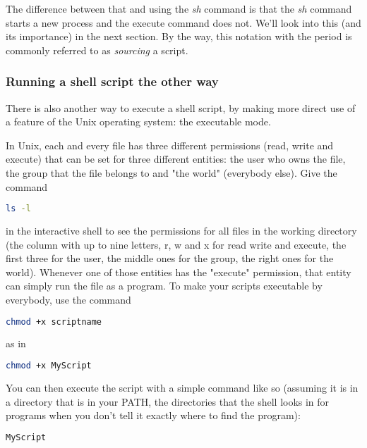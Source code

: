 The difference between that and using the \textit{sh} command is that the
\textit{sh} command starts a new process and the execute command does not.
We'll look into this (and its importance) in the next section. By the way, this
notation with the period is commonly referred to as \textit{sourcing} a script.

\subsubsection{Running a shell script the other way}
There is also another way to execute a shell script, by making more direct use
of a feature of the Unix operating system: the executable mode.

In Unix, each and every file has three different permissions (read, write and
execute) that can be set for three different entities: the user who owns the
file, the group that the file belongs to and "the world" (everybody else). Give
the command
\lstset{basicstyle=\scriptsize, numbers=left, captionpos=b, tabsize=4}
\begin{lstlisting}[language={bash},
xleftmargin=15pt]
ls -l
\end{lstlisting}

in the interactive shell to see the permissions for all files in the working
directory (the column with up to nine letters, r, w and x for read write and
execute, the first three for the user, the middle ones for the group, the right
ones for the world). Whenever one of those entities has the "execute"
permission, that entity can simply run the file as a program. To make your
scripts executable by everybody, use the command
\lstset{basicstyle=\scriptsize, numbers=left, captionpos=b, tabsize=4}
\begin{lstlisting}[language={bash},
xleftmargin=15pt]
chmod +x scriptname
\end{lstlisting}

as in 
\lstset{basicstyle=\scriptsize, numbers=left, captionpos=b, tabsize=4}
\begin{lstlisting}[caption=Making MyScript executable,language={bash},
xleftmargin=15pt, label=lst:Making MyScript executable]
chmod +x MyScript
\end{lstlisting}

You can then execute the script with a simple command like so (assuming it is
in a directory that is in your PATH, the directories that the shell looks in
for programs when you don't tell it exactly where to find the program):
\lstset{basicstyle=\scriptsize, numbers=left, captionpos=b, tabsize=4}
\begin{lstlisting}[caption=Running a command in a new shell,language={bash},
xleftmargin=15pt, label=lst:Running a command in a new shell]
MyScript
\end{lstlisting}

